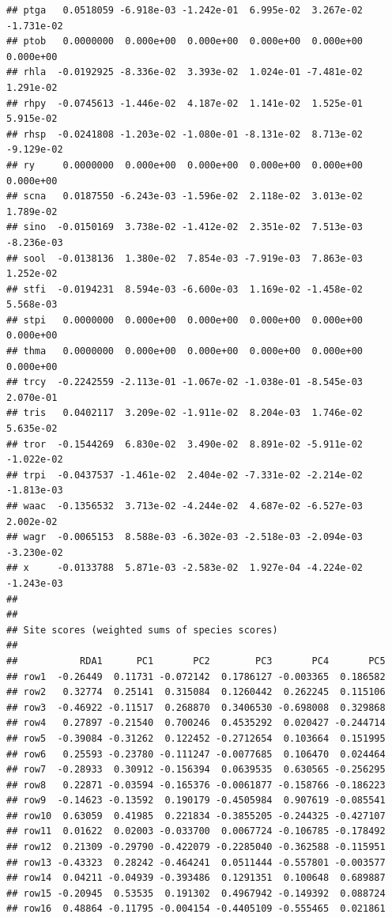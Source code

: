 \documentclass[
]{article}
\begin{document}
\begin{verbatim}
## ptga   0.0518059 -6.918e-03 -1.242e-01  6.995e-02  3.267e-02 -1.731e-02
## ptob   0.0000000  0.000e+00  0.000e+00  0.000e+00  0.000e+00  0.000e+00
## rhla  -0.0192925 -8.336e-02  3.393e-02  1.024e-01 -7.481e-02  1.291e-02
## rhpy  -0.0745613 -1.446e-02  4.187e-02  1.141e-02  1.525e-01  5.915e-02
## rhsp  -0.0241808 -1.203e-02 -1.080e-01 -8.131e-02  8.713e-02 -9.129e-02
## ry     0.0000000  0.000e+00  0.000e+00  0.000e+00  0.000e+00  0.000e+00
## scna   0.0187550 -6.243e-03 -1.596e-02  2.118e-02  3.013e-02  1.789e-02
## sino  -0.0150169  3.738e-02 -1.412e-02  2.351e-02  7.513e-03 -8.236e-03
## sool  -0.0138136  1.380e-02  7.854e-03 -7.919e-03  7.863e-03  1.252e-02
## stfi  -0.0194231  8.594e-03 -6.600e-03  1.169e-02 -1.458e-02  5.568e-03
## stpi   0.0000000  0.000e+00  0.000e+00  0.000e+00  0.000e+00  0.000e+00
## thma   0.0000000  0.000e+00  0.000e+00  0.000e+00  0.000e+00  0.000e+00
## trcy  -0.2242559 -2.113e-01 -1.067e-02 -1.038e-01 -8.545e-03  2.070e-01
## tris   0.0402117  3.209e-02 -1.911e-02  8.204e-03  1.746e-02  5.635e-02
## tror  -0.1544269  6.830e-02  3.490e-02  8.891e-02 -5.911e-02 -1.022e-02
## trpi  -0.0437537 -1.461e-02  2.404e-02 -7.331e-02 -2.214e-02 -1.813e-03
## waac  -0.1356532  3.713e-02 -4.244e-02  4.687e-02 -6.527e-03  2.002e-02
## wagr  -0.0065153  8.588e-03 -6.302e-03 -2.518e-03 -2.094e-03 -3.230e-02
## x     -0.0133788  5.871e-03 -2.583e-02  1.927e-04 -4.224e-02 -1.243e-03
## 
## 
## Site scores (weighted sums of species scores)
## 
##           RDA1      PC1       PC2        PC3       PC4       PC5
## row1  -0.26449  0.11731 -0.072142  0.1786127 -0.003365  0.186582
## row2   0.32774  0.25141  0.315084  0.1260442  0.262245  0.115106
## row3  -0.46922 -0.11517  0.268870  0.3406530 -0.698008  0.329868
## row4   0.27897 -0.21540  0.700246  0.4535292  0.020427 -0.244714
## row5  -0.39084 -0.31262  0.122452 -0.2712654  0.103664  0.151995
## row6   0.25593 -0.23780 -0.111247 -0.0077685  0.106470  0.024464
## row7  -0.28933  0.30912 -0.156394  0.0639535  0.630565 -0.256295
## row8   0.22871 -0.03594 -0.165376 -0.0061877 -0.158766 -0.186223
## row9  -0.14623 -0.13592  0.190179 -0.4505984  0.907619 -0.085541
## row10  0.63059  0.41985  0.221834 -0.3855205 -0.244325 -0.427107
## row11  0.01622  0.02003 -0.033700  0.0067724 -0.106785 -0.178492
## row12  0.21309 -0.29790 -0.422079 -0.2285040 -0.362588 -0.115951
## row13 -0.43323  0.28242 -0.464241  0.0511444 -0.557801 -0.003577
## row14  0.04211 -0.04939 -0.393486  0.1291351  0.100648  0.689887
## row15 -0.20945  0.53535  0.191302  0.4967942 -0.149392  0.088724
## row16  0.48864 -0.11795 -0.004154 -0.4405109 -0.555465  0.021861

\end{verbatim}
\end{document}
